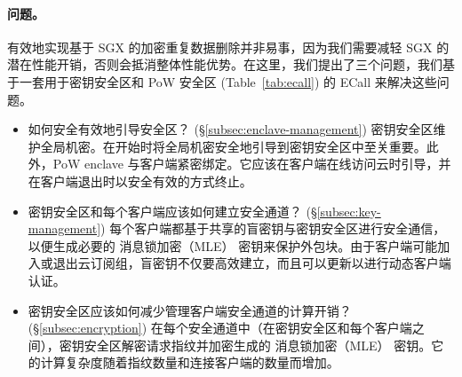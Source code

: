 \paragraph{问题。} 有效地​​实现基于 SGX 的加密重复数据删除并非易事，因为我们需要减轻 SGX 的潜在性能开销，否则会抵消整体性能优势。在这里，我们提出了三个问题，我们基于一套用于密钥安全区和 PoW 安全区 (Table~\ref{tab:ecall}) 的 ECall 来解决这些问题。

\begin{itemize}[leftmargin=*]
\item 如何安全有效地引导安全区？ (\S\ref{subsec:enclave-management})
  密钥安全区维护全局机密。在开始时将全局机密安全地引导到密钥安全区中至关重要。此外，PoW enclave 与客户端紧密绑定。它应该在客户端在线访问云时引导，并在客户端退出时以安全有效的方式终止。
\item 密钥安全区和每个客户端应该如何建立安全通道？ (\S\ref{subsec:key-management})
  每个客户端都基于共享的盲密钥与密钥安全区进行安全通信，以便生成必要的 消息锁加密（MLE） 密钥来保护外包块。由于客户端可能加入或退出云订阅组，盲密钥不仅要高效建立，而且可以更新以进行动态客户端认证。
\item 密钥安全区应该如何减少管理客户端安全通道的计算开销？ (\S\ref{subsec:encryption})
  在每个安全通道中（在密钥安全区和每个客户端之间），密钥安全区解密请求指纹并加密生成的 消息锁加密（MLE） 密钥。它的计算复杂度随着指纹数量和连接客户端的数量而增加。
\end{itemize}
